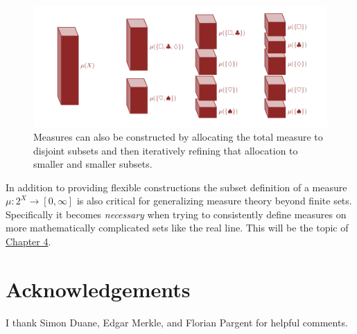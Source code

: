 \documentclass[
  letterpaper,
  DIV=11,
  numbers=noendperiod]{scrartcl}
\begin{document}
\begin{figure}

{\centering \includegraphics[width=1\textwidth,height=\textheight]{figures/decompositions/refinement/refinement.pdf}

}

\caption{\label{fig-refinement}Measures can also be constructed by
allocating the total measure to disjoint subsets and then iteratively
refining that allocation to smaller and smaller subsets.}

\end{figure}

In addition to providing flexible constructions the subset definition of
a measure \(\mu : 2^{X} \rightarrow [0, \infty]\) is also critical for
generalizing measure theory beyond finite sets. Specifically it becomes
\emph{necessary} when trying to consistently define measures on more
mathematically complicated sets like the real line. This will be the
topic of
\href{https://betanalpha.github.io/assets/chapters_html/probability_on_general_spaces.html}{Chapter
4}.

\hypertarget{acknowledgements}{%
\section{Acknowledgements}\label{acknowledgements}}

I thank Simon Duane, Edgar Merkle, and Florian Pargent for helpful
comments.
\end{document}
